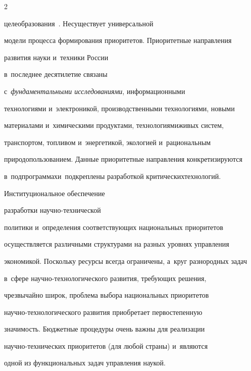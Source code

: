 \begin{multicols}{2}
\begin{enumerate}[1.]
целеобразования~\cite{8-sun, 11-sun, 12-sun}. Не\linebreak существует универсальной 

модели процесса формирования приоритетов. Приоритетные на\-прав\-ле\-ния 

развития науки и~техники России\linebreak

 в~последнее десятилетие связаны 

с~\textit{фундаментальными исследованиями}, информационными\linebreak 

технологиями и~электроникой, производственными технологиями, новыми 

материалами и~химическими продуктами, технологиями\linebreak живых сис\-тем, 

транспортом, топливом и~энергетикой, экологией и~рациональным 

природопользованием. Данные приоритетные на\-прав\-ле\-ния конкретизируются 

в~подпрограммах\linebreak и~подкреплены разработкой критических\linebreak технологий. 

Институциональное обеспечение\linebreak

 разработки на\-уч\-но-тех\-ни\-че\-ской 

политики и~определения соответствующих национальных приоритетов 

осуществляется различными структурами на разных уровнях управ\-ле\-ния 

экономикой. Поскольку ресурсы всегда ограничены, а~круг разнородных задач 

в~сфере на\-уч\-но-тех\-но\-ло\-ги\-че\-ско\-го развития, тре\-бу\-ющих решения, 

чрезвычайно широк, проб\-ле\-ма выбора национальных приоритетов  

на\-уч\-но-тех\-но\-ло\-ги\-че\-ско\-го развития приобретает первостепенную 

зна\-чи\-мость. Бюджетные процедуры очень важны для реализации  

на\-уч\-но-тех\-ни\-че\-ских приоритетов (для любой страны) и~являются 

одной из функциональных задач управ\-ле\-ния наукой.

\end{enumerate}


\end{multicols}
